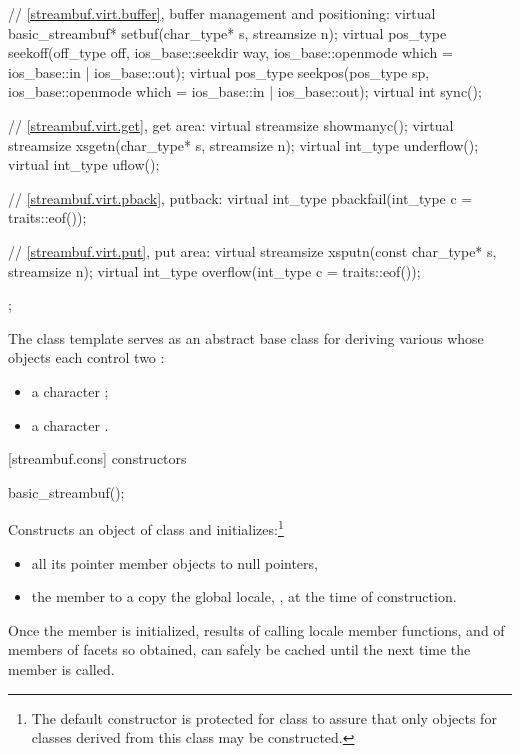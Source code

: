 \begin{codeblock}
{{    // \ref{streambuf.virt.buffer}, buffer management and positioning:
    virtual basic_streambuf* setbuf(char_type* s, streamsize n);
    virtual pos_type seekoff(off_type off, ios_base::seekdir way,
                             ios_base::openmode which
                               = ios_base::in | ios_base::out);
    virtual pos_type seekpos(pos_type sp,
                             ios_base::openmode which
                               = ios_base::in | ios_base::out);
    virtual int      sync();

    // \ref{streambuf.virt.get}, get area:
    virtual streamsize showmanyc();
    virtual streamsize xsgetn(char_type* s, streamsize n);
    virtual int_type   underflow();
    virtual int_type   uflow();

    // \ref{streambuf.virt.pback}, putback:
    virtual int_type   pbackfail(int_type c = traits::eof());

    // \ref{streambuf.virt.put}, put area:
    virtual streamsize xsputn(const char_type* s, streamsize n);
    virtual int_type   overflow(int_type c = traits::eof());
  };
}
\end{codeblock}

\pnum
The class template
serves as an abstract base class for deriving various
whose objects each control two
:
\begin{itemize}
\item
a character
;
\item
a character
.
\end{itemize}

[streambuf.cons]{ constructors}

%
\begin{itemdecl}
basic_streambuf();
\end{itemdecl}

\begin{itemdescr}
\pnum
\effects
Constructs an object of class
and initializes:\footnote{The default constructor is protected for class
to assure that only objects for classes
derived from this class may be constructed.}
\begin{itemize}
\item
all its pointer member objects to null pointers,
\item
the
member to a copy the global locale,
,
at the time of construction.
\end{itemize}

\pnum
\remarks
Once the
member is initialized, results of calling locale member functions,
and of members of facets so obtained, can safely be cached until the
next time the member
is called.
\end{itemdescr}

